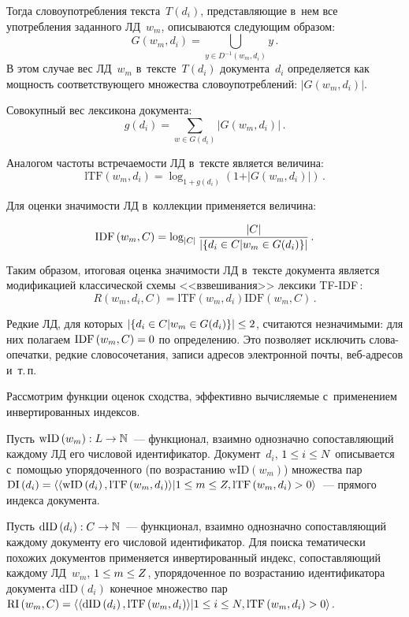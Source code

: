 \begin{multicols}{2}
 Тогда 
словоупотребления текста~$T(d_i)$, пред\-став\-ля\-ющие в~нем все употребления 
заданного ЛД~$w_m$, описываются следующим образом:
  $$
  G(w_m,d_i)=\mathop{\bigcup}\limits_{y\in D^{-1}(w_m,d_i)} y\,.
  $$
    В этом случае вес ЛД~$w_m$ в~тексте~$T(d_i)$ документа~$d_i$ 
определяется как мощность соответствующего множества словоупотреблений: 
$\vert G(w_m, d_i)\vert$.
  
  Совокупный вес лексикона документа:
   $$
  g(d_i)=\sum\limits_{w\in G(d_i)} \vert G(w_m,d_i)\vert\,.
  $$
  
  Аналогом частоты встречаемости ЛД в~тексте является величина:
     $$
   \mathrm{lTF} 
\left(w_m,d_i\right)= \log_{1+g(d_i)} \left( 1+ \vert G(w_m,d_i)\vert \right)\,. 
$$
  
  Для оценки значимости ЛД в~коллекции применяется величина:
  
  \noindent
  $$
  \mathrm{IDF}\left(w_m,C\right)=\log_{\vert C\vert} \displaystyle\frac{\displaystyle \vert C\vert\mathstrut}{\displaystyle \vert \{d_i\in C\vert w_m\in 
G(d_i)\}\vert\mathstrut}\,.
  $$
  
  Таким образом, итоговая оценка значимости ЛД в~тексте документа является 
модификацией классической схемы <<взвешивания>> лексики TF-IDF\,: 
$$
R\left(w_m, d_i, C\right)= \mathrm{lTF}\left(w_m, d_i\right)
\mathrm{IDF}\left(w_m, C\right)\,.
$$
  
  Редкие ЛД, для которых $\vert \{d_i\in C\vert w_m\in G(d_i) \}\vert \hm\leq 2$, 
считаются незначимыми: для них полагаем $\mathrm{IDF}\left(w_m, C\right)\hm=0$ по 
определению. Это позволяет исключить сло\-ва-опе\-чат\-ки, редкие 
словосочетания, записи адресов электронной почты, веб-ад\-ре\-сов и~т.\,п.
  
  Рассмотрим функции оценок сходства, эффективно вычисляемые 
  с~применением инвертированных индексов. 
  
  Пусть $\mathrm{wID}\left(w_m\right): L\hm\to 
{\mathbb{N}}$~--- функционал, взаимно однозначно сопоставляющий каж\-до\-му 
ЛД его числовой идентификатор. Документ~$d_i$, $1\hm\leq i\hm\leq N$ 
описывается с~помощью упорядоченного (по возрастанию $\mathrm{wID}\left(w_m\right)$) 
множества пар  
$\mathrm{DI}\left(d_i\right)\hm= \langle \langle \mathrm{wID}\left(d_i\right), 
\mathrm{lTF}\left(w_m, d_i\right)\rangle \vert 1\hm\leq 
m\hm\leq Z, \mathrm{lTF}\left(w_m, d_i\right)\hm> 0\rangle$~--- 
прямого индекса документа.

  Пусть $\mathrm{dID}\left(d_i\right): C\hm\to \mathbb{N}$~--- функционал, взаимно однозначно 
сопоставляющий каждому документу его числовой идентификатор. Для поиска 
тематически похожих документов применяется инвертированный индекс, 
сопоставляющий каждому ЛД~$w_m$, $1\hm\leq m\hm\leq Z$, упорядоченное 
по возрастанию идентификатора документа $\mathrm{dID}\left(d_i\right)$ 
конечное множество пар 
$\mathrm{RI}\left(w_m, C\right)\hm= \langle \langle \mathrm{dID}\left(d_i\right), 
\mathrm{lTF}\left(w_m, d_i\right)\rangle\vert 1\hm\leq 
i\hm\leq N, \mathrm{lTF}\left(w_m, d_i\right)\hm>0\rangle$. 
  

\end{multicols}
